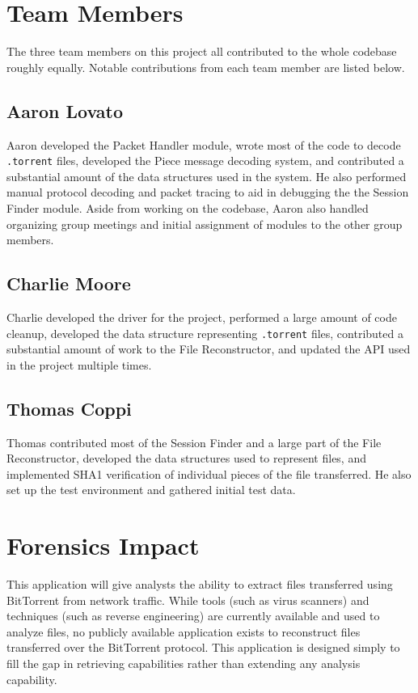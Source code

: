 \documentclass{acm_proc_article-sp}
\begin{document}
\section{Team Members}
The three team members on this project all contributed to the whole codebase 
roughly equally. Notable contributions from each team member are listed below.

\subsection{Aaron Lovato}
Aaron developed the Packet Handler module, wrote most of the code to decode
\texttt{.torrent} files, developed the Piece message decoding system, and
contributed a substantial amount of the data structures used in the system. He
also performed manual protocol decoding and packet tracing to aid in debugging
the the Session Finder module. Aside from working on the codebase, Aaron also
handled organizing group meetings and initial assignment of modules to the other
group members.

\subsection{Charlie Moore}
Charlie developed the driver for the project, performed a large amount of code
cleanup, developed the data structure representing \texttt{.torrent} files,
contributed a substantial amount of work to the File Reconstructor, and updated
the API used in the project multiple times.

\subsection{Thomas Coppi}
Thomas contributed most of the Session Finder and a large part of the File
Reconstructor, developed the data structures used to represent files,
and implemented SHA1 verification of individual pieces of the file transferred.
He also set up the test environment and gathered initial test data.

\section{Forensics Impact}
This application will give analysts the ability to extract files transferred
using BitTorrent from network traffic. While tools (such as virus scanners) and
techniques (such as reverse engineering) are currently available and used to
analyze files, no publicly available application exists to reconstruct files
transferred over the BitTorrent protocol. This application is designed simply to
fill the gap in retrieving capabilities rather than extending any analysis
capability.
\end{document}
